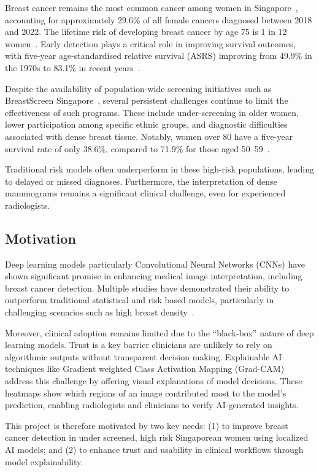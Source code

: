 \documentclass[12pt]{article}
\begin{document}
Breast cancer remains the most common cancer among women in Singapore~\cite{10}, accounting for approximately 29.6\% of all female cancers diagnosed between 2018 and 2022. The lifetime risk of developing breast cancer by age 75 is 1 in 12 women~\cite{10}. Early detection plays a critical role in improving survival outcomes, with five-year age-standardised relative survival (ASRS) improving from 49.9\% in the 1970s to 83.1\% in recent years~\cite{10}.

Despite the availability of population-wide screening initiatives such as BreastScreen Singapore~\cite{6}, several persistent challenges continue to limit the effectiveness of such programs. These include under-screening in older women, lower participation among specific ethnic groups, and diagnostic difficulties associated with dense breast tissue. Notably, women over 80 have a five-year survival rate of only 38.6\%, compared to 71.9\% for those aged 50--59~\cite{10}. 

Traditional risk models often underperform in these high-risk populations, leading to delayed or missed diagnoses. Furthermore, the interpretation of dense mammograms remains a significant clinical challenge, even for experienced radiologists. 

\subsection{Motivation}
Deep learning models particularly Convolutional Neural Networks (CNNs) have shown significant promise in enhancing medical image interpretation, including breast cancer detection. Multiple studies have demonstrated their ability to outperform traditional statistical and risk based models, particularly in challenging scenarios such as high breast density~\cite{1,7,13}. 

Moreover, clinical adoption remains limited due to the ``black-box'' nature of deep learning models. Trust is a key barrier clinicians are unlikely to rely on algorithmic outputs without transparent decision making. Explainable AI techniques like Gradient weighted Class Activation Mapping (Grad-CAM)~\cite{5} address this challenge by offering visual explanations of model decisions. These heatmaps show which regions of an image contributed most to the model's prediction, enabling radiologists and clinicians to verify AI-generated insights.

This project is therefore motivated by two key needs: (1) to improve breast cancer detection in under screened, high risk Singaporean women using localized AI models; and (2) to enhance trust and usability in clinical workflows through model explainability.
\end{document}
